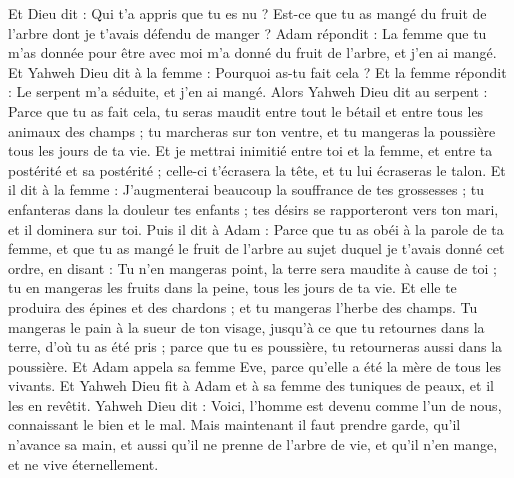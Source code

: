 \begin{multicols}{2}
Et Dieu dit : Qui t'a appris que tu es nu ? Est-ce que tu as mangé du fruit de l'arbre dont je t'avais défendu de manger ?
Adam répondit : La femme que tu m'as donnée pour être avec moi m'a donné du fruit de l'arbre, et j'en ai mangé.
Et Yahweh Dieu dit à la femme : Pourquoi as-tu fait cela ? Et la femme répondit : Le serpent m'a séduite, et j'en ai mangé.
Alors Yahweh Dieu dit au serpent : Parce que tu as fait cela, tu seras maudit entre tout le bétail et entre tous les animaux des champs ; tu marcheras sur ton ventre, et tu mangeras la poussière tous les jours de ta vie.
Et je mettrai inimitié entre toi et la femme, et entre ta postérité et sa postérité ; celle-ci t'écrasera la tête, et tu lui écraseras le talon.
Et il dit à la femme : J'augmenterai beaucoup la souffrance de tes grossesses ; tu enfanteras dans la douleur tes enfants ; tes désirs se rapporteront vers ton mari, et il dominera sur toi.
Puis il dit à Adam : Parce que tu as obéi à la parole de ta femme, et que tu as mangé le fruit de l'arbre au sujet duquel je t'avais donné cet ordre, en disant : Tu n'en mangeras point, la terre sera maudite à cause de toi ; tu en mangeras les fruits dans la peine, tous les jours de ta vie.
Et elle te produira des épines et des chardons ; et tu mangeras l'herbe des champs.
Tu mangeras le pain à la sueur de ton visage, jusqu'à ce que tu retournes dans la terre, d'où tu as été pris ; parce que tu es poussière, tu retourneras aussi dans la poussière. 
Et Adam appela sa femme Eve, parce qu'elle a été la mère de tous les vivants.
Et Yahweh Dieu fit à Adam et à sa femme des tuniques de peaux, et il les en revêtit.
Yahweh Dieu dit : Voici, l'homme est devenu comme l'un de nous, connaissant le bien et le mal. Mais maintenant il faut prendre garde, qu'il n'avance sa main, et aussi qu'il ne prenne de l'arbre de vie, et qu'il n'en mange, et ne vive éternellement.

\end{multicols}
